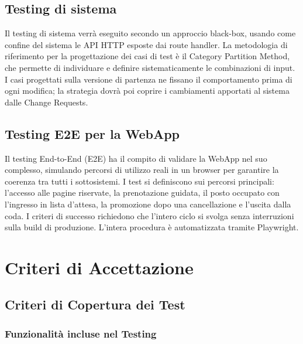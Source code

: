 \documentclass[11pt,a4paper,oneside,openany]{book}
\begin{document}
\section{Testing di sistema}

Il testing di sistema verrà eseguito secondo un approccio black-box, usando
come confine del sistema le API HTTP esposte dai route handler. La metodologia
di riferimento per la progettazione dei casi di test è il Category Partition
Method, che permette di individuare e definire sistematicamente le
combinazioni di input. I casi progettati sulla versione di partenza ne
fissano il comportamento prima di ogni modifica; la strategia dovrà poi
coprire i cambiamenti apportati al sistema dalle Change Requests.

\section{Testing E2E per la WebApp}

Il testing End-to-End (E2E) ha il compito di validare la WebApp nel suo
complesso, simulando percorsi di utilizzo reali in un browser per garantire la
coerenza tra tutti i sottosistemi. I test si definiscono sui percorsi
principali: l'accesso alle pagine riservate, la prenotazione guidata, il posto
occupato con l'ingresso in lista d'attesa, la promozione dopo una
cancellazione e l'uscita dalla coda. I criteri di successo richiedono che
l'intero ciclo si svolga senza interruzioni sulla build di produzione.
L'intera procedura è automatizzata tramite Playwright.

\chapter{Criteri di Accettazione}

\section{Criteri di Copertura dei Test}

\subsection{Funzionalità incluse nel Testing}
\end{document}
